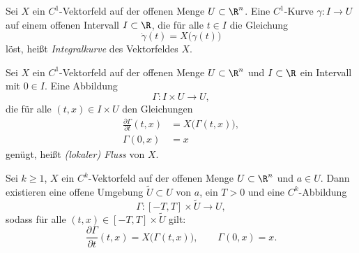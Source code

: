 \documentclass[11pt]{article}
\begin{document}
\begin{definition}[Integralkurve]\Theorem
  Sei $X$ ein $C^1$-Vektorfeld auf der offenen Menge $U \subset \R^n$. Eine $C^1$-Kurve $\gamma\colon I \to U$ auf einem offenen Intervall $I \subset \R$, die für alle $t \in I$ die Gleichung
  \[ \dot{\gamma}(t) = X\bigl(\gamma(t)\bigr) \]
  löst, heißt \emph{Integralkurve} des Vektorfeldes $X$.
\end{definition}


\begin{definition}[Fluss]\Theorem
  Sei $X$ ein $C^1$-Vektorfeld auf der offenen Menge $U \subset \R^n$ und $I \subset \R$ ein Intervall mit $0 \in I$. Eine Abbildung
  \[ \Gamma\colon I \times U \to U, \]
  die für alle $(t, x) \in I \times U$ den Gleichungen
  \begin{align*}
    \frac{\partial \Gamma}{\partial t}(t, x) &= X\bigl(\Gamma(t, x)\bigr), \\
    \Gamma(0, x) &= x
  \end{align*}
  genügt, heißt \emph{(lokaler) Fluss} von $X$.
\end{definition}


\begin{theorem}\Theorem
  Sei $k \ge 1$, $X$ ein $C^k$-Vektorfeld auf der offenen Menge $U \subset \R^n$ und $a \in U$. Dann existieren eine offene Umgebung $\tilde{U} \subset U$ von $a$, ein $T > 0$ und eine $C^k$-Abbildung
  \[ \Gamma\colon [-T, T] \times \tilde{U} \to U, \]
  sodass für alle $(t, x) \in [-T, T] \times \tilde{U}$ gilt:
  \[ \frac{\partial \Gamma}{\partial t}(t, x) = X\bigl(\Gamma(t, x)\bigr), \qquad \Gamma(0, x) = x. \]
\end{theorem}




\PropertyNotice
\end{document}
